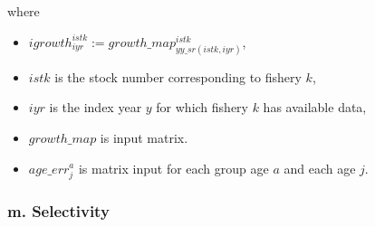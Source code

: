 \documentclass{article}
\begin{document}
where
\begin{itemize}
    \item $igrowth^{istk}_{iyr}:=growth\_map^{istk}_{yy\_sr(istk,iyr)}$, 
    \item $istk$ is the stock number corresponding to fishery $k$, 
    \item $iyr$ is the index year $y$ for which fishery $k$ has available data,
    \item $growth\_map$ is input matrix.
    \item $age\_err^a_j$ is matrix input for each group age $a$ and each age $j$.
\end{itemize}


\subsubsection{m. Selectivity} \label{ch: selec}
\end{document}
